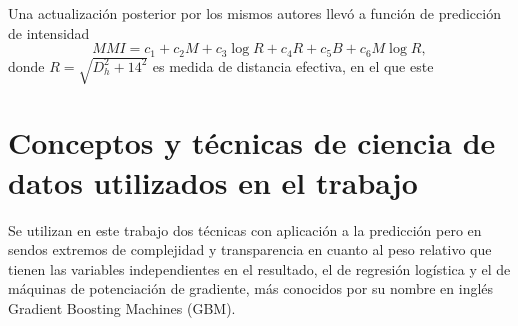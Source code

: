 \documentclass[a4paper]{report}
\begin{document}
Una actualización posterior por los mismos autores llevó a  función de predicción de intensidad  
\begin{equation}
	MMI = c_1 + c_2 M + c_3 \log{R} + c_4 R + c_5 B + c_6 M \log{R},
	\label{eq:atkinson2014}
\end{equation}
donde \(R = \sqrt{D_h^2 + 14^2 }\) es medida de distancia efectiva, en el que este 










\section{Conceptos y técnicas de ciencia de datos utilizados en el trabajo}


Se utilizan en este trabajo dos técnicas con aplicación a la predicción pero en sendos extremos de complejidad y transparencia en cuanto al peso relativo que tienen las variables independientes en el resultado, el de regresión logística y el de máquinas de potenciación de gradiente, más conocidos por su nombre en inglés Gradient Boosting Machines (GBM).
\end{document}
